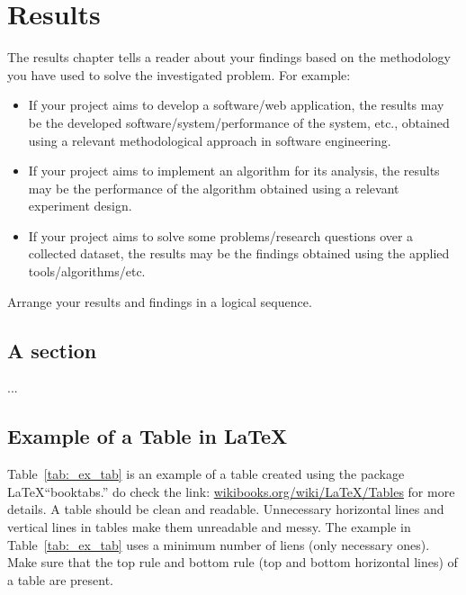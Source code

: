 \chapter{Results}
\label{ch:results}
The results chapter tells a reader about your findings based on the methodology you have used to solve the investigated problem. For example: 
\begin{itemize}
    \item If your project aims to develop a software/web application, the results may be the developed software/system/performance of the system, etc., obtained using a relevant methodological approach in software engineering. 
    
    \item If your project aims to implement an algorithm for its analysis, the results may be the performance of the algorithm obtained using a relevant experiment design. 
    
    \item If your project aims to solve some problems/research questions over a collected dataset, the results may be the findings obtained using the applied tools/algorithms/etc. 
\end{itemize}
Arrange your results and findings in a logical sequence. 



\section{A section}

...

\clearpage
\section{Example of a Table in \LaTeX}
Table~\ref{tab:_ex_tab} is an example of a table created using the package \LaTeX  ``booktabs.'' do check the link: \href{https://en.wikibooks.org/wiki/LaTeX/Tables}{wikibooks.org/wiki/LaTeX/Tables} for more details. A table should be clean and readable. Unnecessary horizontal lines and vertical lines in tables make them unreadable and messy. The example in Table~\ref{tab:_ex_tab} uses a minimum number of liens (only necessary ones). Make sure that the top rule and bottom rule (top and bottom horizontal lines) of a table are present. 

